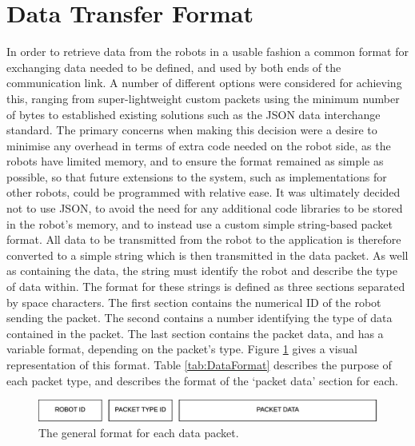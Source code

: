 \section{Data Transfer Format} \label{DataTransferFormat}
In order to retrieve data from the robots in a usable fashion a common format for exchanging data needed to be defined, and used by both ends of the communication link. A number of different options were considered for achieving this, ranging from super-lightweight custom packets using the minimum number of bytes to established existing solutions such as the JSON data interchange standard. The primary concerns when making this decision were a desire to minimise any overhead in terms of extra code needed on the robot side, as the robots have limited memory, and to ensure the format remained as simple as possible, so that future extensions to the system, such as implementations for other robots, could be programmed with relative ease. It was ultimately decided not to use JSON, to avoid the need for any additional code libraries to be stored in the robot's memory, and to instead use a custom simple string-based packet format. All data to be transmitted from the robot to the application is therefore converted to a simple string which is then transmitted in the data packet. As well as containing the data, the string must identify the robot and describe the type of data within. The format for these strings is defined as three sections separated by space characters. The first section contains the numerical ID of the robot sending the packet. The second contains a number identifying the type of data contained in the packet. The last section contains the packet data, and has a variable format, depending on the packet's type. Figure \ref{fig:DataFormat} gives a visual representation of this format. Table \ref{tab:DataFormat} describes the purpose of each packet type, and describes the format of the `packet data' section for each.

\begin{figure}
	\centering
	\includegraphics[scale=0.3]{Figures/DataFormat.png}
	\decoRule
	\caption[Data Format]{The general format for each data packet.}
	\label{fig:DataFormat}
\end{figure}

